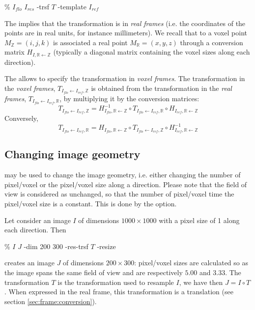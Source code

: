 \begin{code}{0.8}
\% \applyTrsf $I_{flo}$ $I_{res}$ -trsf $T$ -template $I_{ref}$
\end{code}

The  implies that the transformation is in \textit{real frames} (i.e. the coordinates of the points are in real units, for instance millimeters). We recall that to a voxel point $M_{\mathbb{Z}} = (i,j,k)$ is associated a real point $M_{\mathbb{R}} = (x,y,z)$ through a conversion matrix $H_{I,\mathbb{R} \leftarrow \mathbb{Z}}$ (typically a diagonal matrix containing the voxel sizes along each direction).

The  allows to specify the transformation in \textit{voxel frames}. The transformation in the \textit{voxel frames}, $T_{I_{flo} \leftarrow I_{ref}, \mathbb{Z}}$ is obtained from the transformation in the \textit{real frames}, $T_{I_{flo} \leftarrow I_{ref}, \mathbb{R}}$, by multiplying it by the conversion matrices:
$$
T_{I_{flo} \leftarrow I_{ref}, \mathbb{Z}} 
=
H^{-1}_{I_{flo},\mathbb{R} \leftarrow \mathbb{Z}} \circ
T_{I_{flo} \leftarrow I_{ref}, \mathbb{R}} \circ
H_{I_{ref},\mathbb{R} \leftarrow \mathbb{Z}}
$$
Conversely,
$$
T_{I_{flo} \leftarrow I_{ref}, \mathbb{R}} 
=
H_{I_{flo},\mathbb{R} \leftarrow \mathbb{Z}} \circ
T_{I_{flo} \leftarrow I_{ref}, \mathbb{Z}} \circ
H^{-1}_{I_{ref},\mathbb{R} \leftarrow \mathbb{Z}}
$$


\subsection{Changing image geometry}
\label{sec:changing:image:geometry}

\applyTrsf may be used to change the image geometry, i.e. either changing the number of pixel/voxel or the pixel/voxel size along a direction. Please note that the field of view is considered as unchanged, so that the number of pixel/voxel time the pixel/voxel size is a constant. This is done by the  option.

Let consider an image $I$ of dimensions $1000 \times 1000$ with a pixel size of 1 along each direction. Then
\begin{code}{0.8}
\% \applyTrsf $I$ $J$ -dim 200 300 -res-trsf $T$ -resize
\end{code}
creates an image $J$  of dimensions $200 \times 300$: pixel/voxel sizes are calculated so as the image spans the same field of view and are respectively $5.00$ and $3.33$. The transformation $T$ is the transformation used to resample $I$, we have then $J = I \circ T$. When expressed in the real frame, this transformation is a translation (see section \ref{sec:frame:conversion}). 

